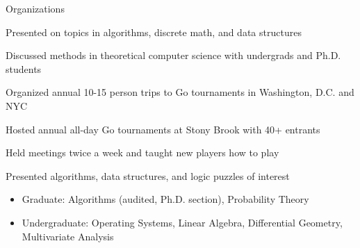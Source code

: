 \documentclass{cv}
\begin{document}
\begin{cvsection}{Organizations}
  {
    \item Presented on topics in algorithms, discrete math, and data structures
    \item Discussed methods in theoretical computer science with undergrads and Ph.D. students
  }
  {
    \item Organized annual 10-15 person trips to Go tournaments in Washington, D.C. and NYC
    \item Hosted annual all-day Go tournaments at Stony Brook with 40+ entrants
    \item Held meetings twice a week and taught new players how to play
  }
  {
    \item Presented algorithms, data structures, and logic puzzles of interest
  }
\end{cvsection}

\begin{minipage}{\textwidth}
  \begin{itemize}[noitemsep,topsep=0pt]%
    \item Graduate: Algorithms (audited, Ph.D. section), Probability Theory
    \item Undergraduate: Operating Systems, Linear Algebra, Differential Geometry, Multivariate Analysis
  \end{itemize}%
\end{minipage}%
\end{document}
